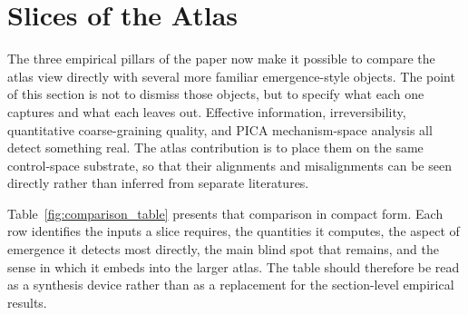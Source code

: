 \documentclass[11pt]{article}
\theoremstyle{definition}
\begin{document}
 \section{Slices of the Atlas}\label{sec:comparison_slices}

The three empirical pillars of the paper now make it possible to compare the atlas view directly with several more familiar emergence-style objects. The point of this section is not to dismiss those objects, but to specify what each one captures and what each leaves out. Effective information, irreversibility, quantitative coarse-graining quality, and PICA mechanism-space analysis all detect something real. The atlas contribution is to place them on the same control-space substrate, so that their alignments and misalignments can be seen directly rather than inferred from separate literatures.

Table~\ref{fig:comparison_table} presents that comparison in compact form. Each row identifies the inputs a slice requires, the quantities it computes, the aspect of emergence it detects most directly, the main blind spot that remains, and the sense in which it embeds into the larger atlas. The table should therefore be read as a synthesis device rather than as a replacement for the section-level empirical results.
\end{document}
